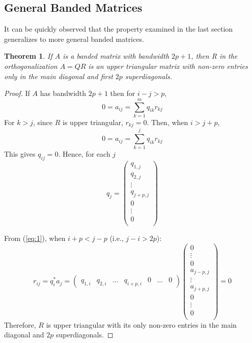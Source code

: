 \documentclass{article}
\numberwithin{pic}{section}
\numberwithin{lem}{section}
\newtheorem{thm}{Theorem}
\numberwithin{thm}{section}
\numberwithin{cor}{section}
\theoremstyle{definition}
\numberwithin{ex}{section}
\numberwithin{defn}{section}
\theoremstyle{definition}
\theoremstyle{remark}
\begin{document}
\subsection{General Banded Matrices}
It can be quickly observed that the property examined in the last section
generalizes to more general banded matrices. 
\begin{thm}
	If $A$ is a banded matrix with bandwidth $2p + 1$, then R in the orthogonalization $A=QR$ is an upper triangular matrix with non-zero entries only in the main diagonal and first $2p$ superdiagonals.
\end{thm}
\begin{proof} If $A$ has bandwidth $2p +1$ then for $i - j > p$, 
	$$ 0 = a_{ij} = \sum_{k = 1}^{m} q_{ik}r_{kj}$$
For $k > j$, since $R$ is upper triangular, $r_{kj} = 0$. Then, when $i > j + p$,
	$$ 0 = a_{ij} = \sum_{k = 1}^{j} q_{ik}r_{kj}$$
This gives $q_{ij} = 0$. Hence, for each $j$
	\begin{equation} \label{eq:1}
		q_{j} = \begin{pmatrix} 
			q_{1,j} \\
			q_{2,j} \\
			\vdots \\
			q_{j+p,j} \\
			0 \\
			\vdots \\
			0 \\
		\end{pmatrix}
	\end{equation}

From (\ref{eq:1}), when $i+p < j - p $ (i.e., $j - i > 2p$):
	$$
		r_{ij} = q_i^* a_j =\begin{pmatrix}
			q_{1,i} & q_{2,i} &	\dots & q_{i+p,i} & 0 & \dots &	0 
		\end{pmatrix}\begin{pmatrix} 
		0 \\
		\vdots \\
		0 \\
		a_{j-p,j} \\
		\vdots \\
		a_{j+p,j} \\
		0 \\
		\vdots \\
		0 \\
		\end{pmatrix} = 0
	$$
Therefore, $R$ is upper triangular with its only non-zero entries in the main diagonal and $2p$ superdiagonals.
\end{proof}
\end{document}
